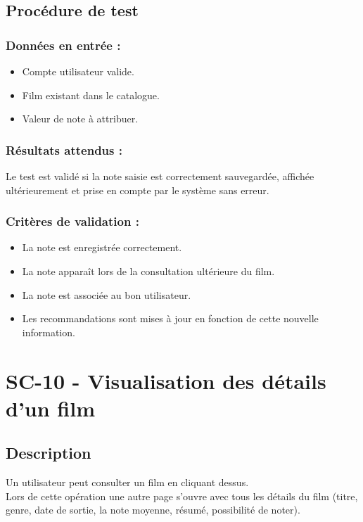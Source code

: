 \documentclass[a4paper,12pt]{report}
\begin{document}
\subsection*{Procédure de test}
\subsubsection{Données en entrée :}
\begin{itemize}
    \item Compte utilisateur valide.
    \item Film existant dans le catalogue.
    \item Valeur de note à attribuer.
\end{itemize}

\subsubsection{Résultats attendus :}
Le test est validé si la note saisie est correctement sauvegardée, affichée ultérieurement et prise en compte par le système sans erreur.

\subsubsection{Critères de validation :}
\begin{itemize}
    \item La note est enregistrée correctement.
    \item La note apparaît lors de la consultation ultérieure du film.
    \item La note est associée au bon utilisateur.
    \item Les recommandations sont mises à jour en fonction de cette nouvelle information.
\end{itemize}
\newpage

\section{SC-10 - Visualisation des détails d'un film}
\label{Fi3}
\subsection*{Description}
Un utilisateur peut consulter un film en cliquant dessus.\\
Lors de cette opération une autre page s'ouvre avec tous les détails du film (titre, genre, date de sortie, la note moyenne, résumé, possibilité de noter).
\end{document}
